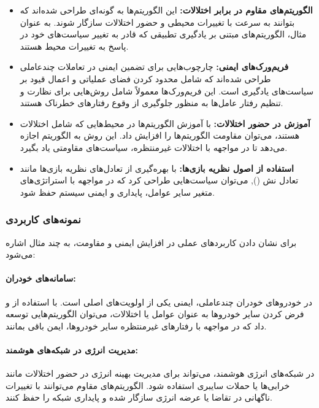 \begin{itemize}
	\item \textbf{الگوریتم‌های مقاوم در برابر اختلالات:} این الگوریتم‌ها به گونه‌ای طراحی شده‌اند که بتوانند به سرعت با تغییرات محیطی و حضور اختلالات سازگار شوند. به عنوان مثال، الگوریتم‌های مبتنی بر یادگیری تطبیقی که قادر به تغییر سیاست‌های خود در پاسخ به تغییرات محیط هستند.
	
	\item \textbf{فریم‌ورک‌های ایمنی:} چارچوب‌هایی برای تضمین ایمنی در تعاملات چندعاملی طراحی شده‌اند که شامل محدود کردن فضای عملیاتی و اعمال قیود بر سیاست‌های یادگیری است. این فریم‌ورک‌ها معمولاً شامل روش‌هایی برای نظارت و تنظیم رفتار عامل‌ها به منظور جلوگیری از وقوع رفتارهای خطرناک هستند.
	
	\item \textbf{آموزش در حضور اختلالات:} با آموزش الگوریتم‌ها در محیط‌هایی که شامل اختلالات هستند، می‌توان مقاومت الگوریتم‌ها را افزایش داد. این روش به الگوریتم اجازه می‌دهد تا در مواجهه با اختلالات غیرمنتظره، سیاست‌های مقاومتی یاد بگیرد.
	
	\item \textbf{استفاده از اصول نظریه بازی‌ها:} با بهره‌گیری از تعادل‌های نظریه بازی‌ها مانند تعادل نش (), می‌توان سیاست‌هایی طراحی کرد که در مواجهه با استراتژی‌های متغیر سایر عوامل، پایداری و ایمنی سیستم حفظ شود.
\end{itemize}

\subsubsection{نمونه‌های کاربردی}

برای نشان دادن کاربردهای عملی  در افزایش ایمنی و مقاومت، به چند مثال اشاره می‌شود:

\paragraph{سامانه‌های خودران:} در خودروهای خودران چندعاملی، ایمنی یکی از اولویت‌های اصلی است. با استفاده از  و فرض کردن سایر خودروها به عنوان عوامل یا اختلالات، می‌توان الگوریتم‌هایی توسعه داد که در مواجهه با رفتارهای غیرمنتظره سایر خودروها، ایمن باقی بمانند.

\paragraph{مدیریت انرژی در شبکه‌های هوشمند:} در شبکه‌های انرژی هوشمند،  می‌تواند برای مدیریت بهینه انرژی در حضور اختلالات مانند خرابی‌ها یا حملات سایبری استفاده شود. الگوریتم‌های مقاوم می‌توانند با تغییرات ناگهانی در تقاضا یا عرضه انرژی سازگار شده و پایداری شبکه را حفظ کنند.

